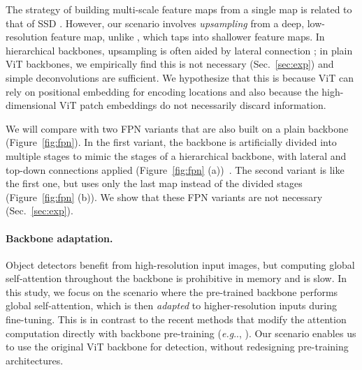 \documentclass[runningheads]{llncs}
\makeatletter
\DeclareRobustCommand\onedot{\futurelet\@let@token\@onedot}
\def\@onedot{\ifx\@let@token.\else.\null\fi\xspace}
\def\eg{\emph{e.g}\onedot} \def\Eg{\emph{E.g}\onedot}
\makeatother
\begin{document}
The strategy of building multi-scale feature maps from a single map is related to that of SSD \cite{Liu2016}. However, our scenario involves \textit{upsampling} from a deep, low-resolution feature map, unlike \cite{Liu2016}, which taps into shallower feature maps. In hierarchical backbones, upsampling is often aided by lateral connection \cite{Lin2017}; in plain ViT backbones, we empirically find this is not necessary (Sec.~\ref{sec:exp}) and simple deconvolutions are sufficient.
We hypothesize that this is because ViT can rely on positional embedding \cite{Vaswani2017} for encoding locations and also because the high-dimensional ViT patch embeddings do not necessarily discard information.\footnotemark


We will compare with two FPN variants that are also built on a plain backbone (Figure~\ref{fig:fpn}). In the first variant, the backbone is artificially divided into multiple stages to mimic the stages of a hierarchical backbone, with lateral and top-down connections applied (Figure~\ref{fig:fpn} (a))~\cite{Elnouby2021}. The second variant is like the first one, but uses only the last map instead of the divided stages (Figure~\ref{fig:fpn} (b)). We show that these FPN variants are not necessary (Sec.~\ref{sec:exp}).\footnotemark


\paragraph{Backbone adaptation.}

Object detectors benefit from high-resolution input images, but computing global self-attention throughout the backbone is prohibitive in memory and is slow. In this study, we focus on the scenario where the pre-trained backbone performs global self-attention, which is then \textit{adapted} to higher-resolution inputs during fine-tuning. This is in contrast to the recent methods that modify the attention computation directly with backbone pre-training (\eg, \cite{Liu2021,Fan2021}). Our scenario enables us to use the original ViT backbone for detection, without redesigning pre-training architectures.
\end{document}
